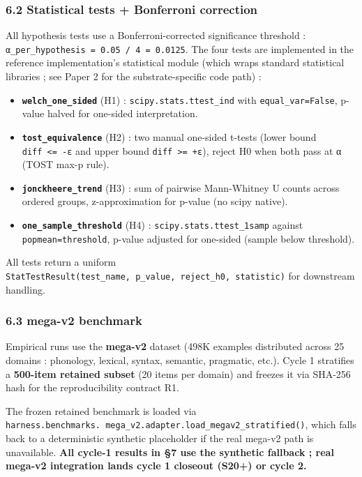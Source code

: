 \documentclass[
]{article}
\providecommand{\tightlist}{%
  \setlength{\itemsep}{0pt}\setlength{\parskip}{0pt}}
\begin{document}
\subsubsection{6.2 Statistical tests + Bonferroni
correction}\label{statistical-tests-bonferroni-correction}

All hypothesis tests use a Bonferroni-corrected significance threshold :
\texttt{α\_per\_hypothesis\ =\ 0.05\ /\ 4\ =\ 0.0125}. The four tests
are implemented in the reference implementation's statistical module
(which wraps standard statistical libraries ; see Paper 2 for the
substrate-specific code path) :

\begin{itemize}
\tightlist
\item
  \textbf{\texttt{welch\_one\_sided}} (H1) :
  \texttt{scipy.stats.ttest\_ind} with \texttt{equal\_var=False},
  p-value halved for one-sided interpretation.
\item
  \textbf{\texttt{tost\_equivalence}} (H2) : two manual one-sided
  t-tests (lower bound \texttt{diff\ \textless{}=\ -ε} and upper bound
  \texttt{diff\ \textgreater{}=\ +ε}), reject H0 when both pass at α
  (TOST max-p rule).
\item
  \textbf{\texttt{jonckheere\_trend}} (H3) : sum of pairwise
  Mann-Whitney U counts across ordered groups, z-approximation for
  p-value (no scipy native).
\item
  \textbf{\texttt{one\_sample\_threshold}} (H4) :
  \texttt{scipy.stats.ttest\_1samp} against \texttt{popmean=threshold},
  p-value adjusted for one-sided (sample below threshold).
\end{itemize}

All tests return a uniform
\texttt{StatTestResult(test\_name,\ p\_value,\ reject\_h0,\ statistic)}
for downstream handling.

\subsubsection{6.3 mega-v2 benchmark}\label{mega-v2-benchmark}

Empirical runs use the \textbf{mega-v2} dataset (498K examples
distributed across 25 domains : phonology, lexical, syntax, semantic,
pragmatic, etc.). Cycle 1 stratifies a \textbf{500-item retained subset}
(20 items per domain) and freezes it via SHA-256 hash for the
reproducibility contract R1.

The frozen retained benchmark is loaded via
\texttt{harness.benchmarks.\ mega\_v2.adapter.load\_megav2\_stratified()},
which falls back to a deterministic synthetic placeholder if the real
mega-v2 path is unavailable. \textbf{All cycle-1 results in §7 use the
synthetic fallback ; real mega-v2 integration lands cycle 1 closeout
(S20+) or cycle 2.}
\end{document}
